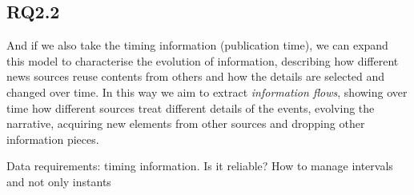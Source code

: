 \subsection{RQ2.2}
And if we also take the timing information (publication time), we can expand this model to characterise the evolution of information, describing how different news sources reuse contents from others and how the details are selected and changed over time.
In this way we aim to extract \textit{information flows}, showing over time how different sources treat different details of the events, evolving the narrative, acquiring new elements from other sources and dropping other information pieces.\textbf{}

Data requirements: timing information.
Is it reliable? How to manage intervals and not only instants








